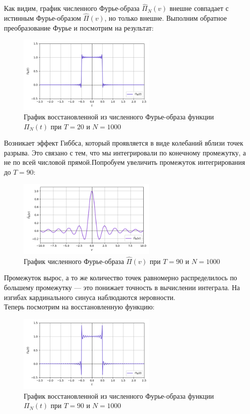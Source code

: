 \documentclass[a4paper]{article}
\begin{document}
Как видим, график численного Фурье-образа $\hat{\Pi}_N(v)$ внешне совпадает с истинным Фурье-образом $\hat{\Pi}(v)$, но только внешне.\newpage
Выполним обратное преобразование Фурье и посмотрим на результат:
\begin{figure}[H]
    \centering \includegraphics[width=0.6\textwidth]{sources/first/part1/T=20 density=1000/4_num_restored.png}
    \caption{График восстановленной из численного Фурье-образа функции $\Pi_N(t)$ при $T = 20$ и $N = 1000$}
\end{figure}
Возникает эффект Гиббса, который проявляется в виде колебаний вблизи точек разрыва. Это связано с тем, что мы интегрировали по конечному промежутку, а не по всей числовой прямой.Попробуем увеличить промежуток интегрирования до $T = 90$:
\begin{figure}[H]
    \centering \includegraphics[width=0.6\textwidth]{sources/first/part1/T=90 density=1000/3_num_image.png}
    \caption{График численного Фурье-образа $\hat{\Pi}(v)$ при $T = 90$ и $N = 1000$}
\end{figure}
Промежуток вырос, а то же количество точек равномерно распределилось по большему промежутку --- это понижает точность в вычислении интеграла. На изгибах кардинального синуса наблюдаются неровности.\\[0.5em] Теперь посмотрим на восстановленную функцию:
\begin{figure}[H]
    \centering \includegraphics[width=0.6\textwidth]{sources/first/part1/T=90 density=1000/4_num_restored.png}
    \caption{График восстановленной из численного Фурье-образа функции $\Pi_N(t)$ при $T = 90$ и $N = 1000$}
\end{figure}
\end{document}

